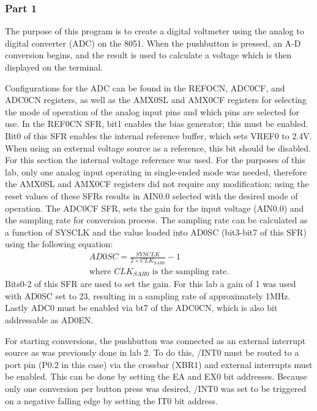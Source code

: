 \documentclass[12pt]{article}
\begin{document}
\subsubsection{Part 1}

The purpose of this program is to create a digital voltmeter using the analog to digital converter (ADC) on the 8051. When the pushbutton is pressed, an A-D conversion begins, and the result is used to calculate a voltage which is then displayed on the terminal. 

Configurations for the ADC can be found in the REFOCN, ADC0CF, and ADC0CN registers, as well as the AMX0SL and AMX0CF registers for selecting the mode of operation of the analog input pins and which pins are selected for use. In the REF0CN SFR, bit1 enables the bias generator; this must be enabled. Bit0 of this SFR enables the internal reference buffer, which sets VREF0 to 2.4V. When using an external voltage source as a reference, this bit should be disabled. For this section the internal voltage reference was used. For the purposes of this lab, only one analog input operating in single-ended mode was needed, therefore the AMX0SL and AMX0CF registers did not require any modification; using the reset values of these SFRs results in AIN0.0 selected with the desired mode of operation. The ADC0CF SFR, sets the gain for the input voltage (AIN0.0) and the sampling rate for conversion process. The sampling rate can be calculated as a function of SYSCLK and the value loaded into AD0SC (bit3-bit7 of this SFR) using the following equation:
\begin{align*}
AD0SC = \frac{SYSCLK}{2\times CLK_{SAR0}}-1\\
\text{where $CLK_{SAR0}$ is the sampling rate.}
\end{align*}
\noindent
Bits0-2 of this SFR are used to set the gain. For this lab a gain of 1 was used with AD0SC set to 23, resulting in a sampling rate of approximately \si{1}{MHz}. Lastly ADC0 must be enabled via bt7 of the ADC0CN, which is also bit addressable as AD0EN.

For starting conversions, the pushbutton was connected as an external interrupt source as was previously done in lab 2. To do this, /INT0 must be routed to a port pin (P0.2 in this case) via the crossbar (XBR1) and external interrupts must be enabled. This can be done by setting the EA and EX0 bit addresses. Because only one conversion per button press was desired, /INT0 was set to be triggered on a negative falling edge by setting the IT0 bit address.
\end{document}
